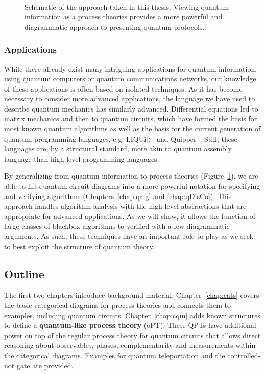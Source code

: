 \begin{figure}[t]
\begin{align*}

\end{align*}
\caption[Schematic of process theories and categorical diagrams.]{Schematic of the approach taken in this thesis. Viewing quantum information as a process theories provides a more powerful and diagrammatic approach to presenting quantum protocols.}
\label{fig:overview}
\end{figure}


\subsubsection*{Applications} While there already exist many intriguing applications for quantum information, using quantum computers or quantum communications networks, our knowledge of these applications is often based on isolated techniques. As it has become necessary to consider more advanced applications, the language we have used to describe quantum mechanics has similarly advanced. Differential equations led to matrix mechanics and then to quantum circuits, which have formed the basis for most known quantum algorithms as well as the basis for the current generation of quantum programming languages, e.g. LIQUi$|\rangle$~\cite{wecker2014liqui} and Quipper~\cite{green2013quipper}. Still, these languages are, by a structural standard, more akin to quantum assembly language than high-level programming languages. 

By generalizing from quantum information to process theories (Figure~\ref{fig:overview}), we are able to lift quantum circuit diagrams into a more powerful notation for specifying and verifying algorithms (Chapters~\ref{chap:qalg} and \ref{chap:qDisCo}). This approach handles algorithm analysis with the high-level abstractions that are appropriate for advanced applications. As we will show, it allows the function of large classes of blackbox algorithms to verified with a few diagrammatic arguments. As such, these techniques have an important role to play as we seek to best exploit the structure of quantum theory. 

\subsection*{Outline}

The first two chapters introduce background material. Chapter~\ref{chap:cats} covers the basic categorical diagrams for process theories and connects them to examples, including quantum circuits. Chapter~\ref{chap:cqm} adds known structures to define a \textbf{quantum-like process theory} (oPT). These QPTs have additional power on top of the regular process theory for quantum circuits that allows direct reasoning about observables, phases, complementarity and measurements within the categorical diagrams. Examples for quantum teleportation and the controlled-not gate are provided.

